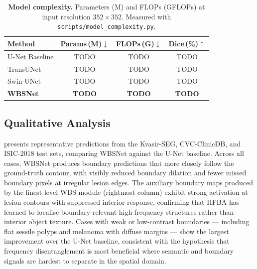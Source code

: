 \documentclass[journal]{IEEEtran}
\begin{document}
\begin{table}[t]
  \centering
  \caption{\textbf{Model complexity.}
    Parameters (M) and FLOPs (GFLOPs) at input resolution $352{\times}352$.
    Measured with \texttt{scripts/model\_complexity.py}.}
  \label{tab:complexity}
  \begin{tabular}{@{}lccc@{}}
    \toprule
    Method & Params\,(M)$\downarrow$ & FLOPs\,(G)$\downarrow$ & Dice\,(\%)$\uparrow$ \\
    \midrule
    U-Net Baseline   & TODO & TODO & TODO \\
    TransUNet        & TODO & TODO & TODO \\
    Swin-UNet        & TODO & TODO & TODO \\
    \textbf{WBSNet}  & \textbf{TODO} & \textbf{TODO} & \textbf{TODO} \\
    \bottomrule
  \end{tabular}
\end{table}

\subsection{Qualitative Analysis}\label{sec:exp:qualitative}

 presents representative predictions from the
Kvasir-SEG, CVC-ClinicDB, and ISIC-2018 test sets, comparing WBSNet against
the U-Net baseline.
Across all cases, WBSNet produces boundary predictions that more closely
follow the ground-truth contour, with visibly reduced boundary dilation and
fewer missed boundary pixels at irregular lesion edges.
The auxiliary boundary maps produced by the finest-level WBS module (rightmost
column) exhibit strong activation at lesion contours with suppressed interior
response, confirming that HFBA has learned to localise boundary-relevant
high-frequency structures rather than interior object texture.
Cases with weak or low-contrast boundaries --- including flat sessile polyps
and melanoma with diffuse margins --- show the largest improvement over the
U-Net baseline, consistent with the hypothesis that frequency disentanglement
is most beneficial where semantic and boundary signals are hardest to separate
in the spatial domain.
\end{document}
